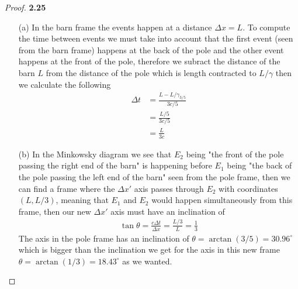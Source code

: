 \documentclass[11pt]{article}
\theoremstyle{definition}
\begin{document}
	\begin{proof}{\textbf{2.25}}
        \begin{itemize}
        \item [(a)] In the barn frame the events happen at a distance $\Delta x = L$.
        To compute the time between events we must take into account that the first
        event (seen from the barn frame) happens at the back of the pole and the other
        event happens at the front of the pole, therefore we subract the distance of the
        barn $L$ from the distance of the pole which is length contracted to $L/\gamma$
        then we calculate the following
        \begin{align*}
            \Delta t &= \frac{L - L/\gamma_{3/5}}{3c/5}\\
                &= \frac{L/5}{3c/5}\\
                &= \frac{L}{3c}
        \end{align*}
        \item [(b)] In the Minkowsky diagram we see that $E_2$ being "the front of the
        pole passing the right end of the barn" is happening before $E_1$ being
        "the back of the pole passing the left end of the barn" seen from the pole
        frame, then we can find a frame where the
        $\Delta x'$ axis passes through $E_2$ with coordinates $(L, L/3)$, meaning
        that $E_1$ and $E_2$ would happen simultaneously from this frame, then our
        new $\Delta x'$ axis must have an inclination of 
        \begin{align*}
            \tan \theta = \frac{c\Delta t}{\Delta x} = \frac{L/3}{L} = \frac{1}{3}
        \end{align*}
        The axis in the pole frame has an inclination of
        $\theta = \arctan(3/5) = 30.96^{\circ}$
        which is bigger than the inclination we get for the axis in this new frame
        $\theta = \arctan(1/3) = 18.43^{\circ}$ as we wanted.
        \end{itemize}
    \end{proof}
\cleardoublepage
\end{document}

